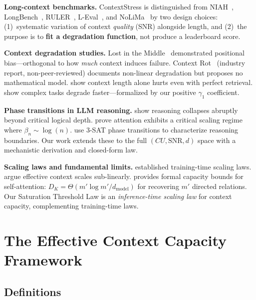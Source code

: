 \documentclass{article}
\begin{document}
\textbf{Long-context benchmarks.}
ContextStress is distinguished from NIAH~\citep{kamradt2023niah}, LongBench~\citep{bai2023longbench,bai2024longbenchv2}, RULER~\citep{hsieh2024ruler}, L-Eval~\citep{an2023leval}, and NoLiMa~\citep{modarressi2025nolima} by two design choices: (1)~systematic variation of context \emph{quality} (SNR) alongside length, and (2)~the purpose is to \textbf{fit a degradation function}, not produce a leaderboard score.

\textbf{Context degradation studies.}
Lost in the Middle~\citep{liu2023lost} demonstrated positional bias---orthogonal to how \emph{much} context induces failure.
Context Rot~\citep{chroma2025contextrot} (industry report, non-peer-reviewed) documents non-linear degradation but proposes no mathematical model.
\citet{li2025context} show context length alone hurts even with perfect retrieval.
\citet{levy2024same} show complex tasks degrade faster---formalized by our positive $\gamma_1$ coefficient.

\textbf{Phase transitions in LLM reasoning.}
\citet{zhang2026logical} show reasoning collapses abruptly beyond critical logical depth.
\citet{polyak2025critical} prove attention exhibits a critical scaling regime where $\beta_n \sim \log(n)$.
\citet{zhao2025reasoning} use 3-SAT phase transitions to characterize reasoning boundaries.
Our work extends these to the full $(CU, \mathrm{SNR}, d)$ space with a mechanistic derivation and closed-form law.

\textbf{Scaling laws and fundamental limits.}
\citet{kaplan2020scaling} established training-time scaling laws.
\citet{chen2025limits} argue effective context scales sub-linearly.
\citet{adler2025capacity} provides formal capacity bounds for self-attention: $D_K = \Theta(m' \log m' / d_{\text{model}})$ for recovering $m'$ directed relations.
Our Saturation Threshold Law is an \emph{inference-time scaling law} for context capacity, complementing training-time laws.

\section{The Effective Context Capacity Framework}
\label{sec:methodology}

\subsection{Definitions}
\end{document}
